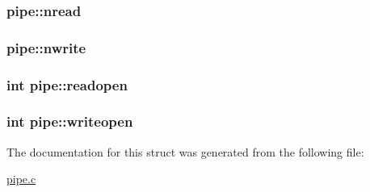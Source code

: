 \subsubsection[{\texorpdfstring{nread}{nread}}]{ pipe\+::nread}\hypertarget{structpipe_ad71eb56c445f9178dac07ae47f352fd1}{}\label{structpipe_ad71eb56c445f9178dac07ae47f352fd1}
\subsubsection[{\texorpdfstring{nwrite}{nwrite}}]{ pipe\+::nwrite}\hypertarget{structpipe_a419b6fc2780013358de51c91371dac66}{}\label{structpipe_a419b6fc2780013358de51c91371dac66}
\subsubsection[{\texorpdfstring{readopen}{readopen}}]{\setlength{\rightskip}{0pt plus 5cm}int pipe\+::readopen}\hypertarget{structpipe_a7bdc57b39ef97dda61e468ad9e8dbfba}{}\label{structpipe_a7bdc57b39ef97dda61e468ad9e8dbfba}
\subsubsection[{\texorpdfstring{writeopen}{writeopen}}]{\setlength{\rightskip}{0pt plus 5cm}int pipe\+::writeopen}\hypertarget{structpipe_a9538da698ddd63615c991a318094663b}{}\label{structpipe_a9538da698ddd63615c991a318094663b}


The documentation for this struct was generated from the following file\+:\begin{DoxyCompactItemize}
\item 
\hyperlink{pipe_8c}{pipe.\+c}\end{DoxyCompactItemize}
